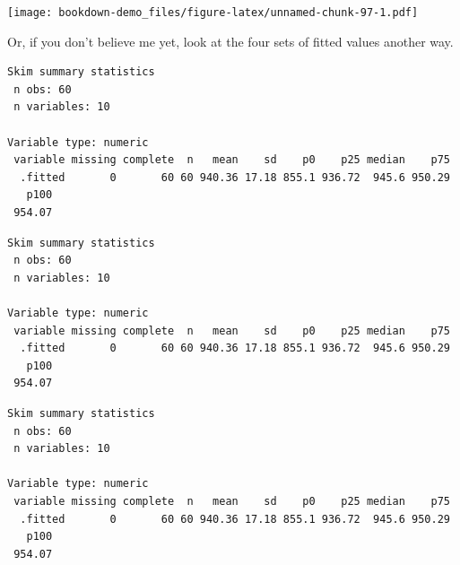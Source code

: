 \documentclass[]{book}
\newenvironment{Shaded}{\begin{snugshade}}{\end{snugshade}}
\newcommand{\KeywordTok}[1]{\textcolor[rgb]{0.13,0.29,0.53}{\textbf{#1}}}
\newcommand{\StringTok}[1]{\textcolor[rgb]{0.31,0.60,0.02}{#1}}
\newcommand{\OperatorTok}[1]{\textcolor[rgb]{0.81,0.36,0.00}{\textbf{#1}}}
\newcommand{\NormalTok}[1]{#1}
\theoremstyle{definition}
\theoremstyle{definition}
\theoremstyle{definition}
\theoremstyle{remark}
\begin{document}
\texttt{[image: bookdown-demo\_files/figure-latex/unnamed-chunk-97-1.pdf]}

Or, if you don't believe me yet, look at the four sets of fitted values
another way.

\begin{Shaded}
\end{Shaded}

\begin{verbatim}
Skim summary statistics
 n obs: 60 
 n variables: 10 

Variable type: numeric 
 variable missing complete  n   mean    sd    p0    p25 median    p75
  .fitted       0       60 60 940.36 17.18 855.1 936.72  945.6 950.29
   p100
 954.07
\end{verbatim}

\begin{Shaded}
\end{Shaded}

\begin{verbatim}
Skim summary statistics
 n obs: 60 
 n variables: 10 

Variable type: numeric 
 variable missing complete  n   mean    sd    p0    p25 median    p75
  .fitted       0       60 60 940.36 17.18 855.1 936.72  945.6 950.29
   p100
 954.07
\end{verbatim}

\begin{Shaded}
\end{Shaded}

\begin{verbatim}
Skim summary statistics
 n obs: 60 
 n variables: 10 

Variable type: numeric 
 variable missing complete  n   mean    sd    p0    p25 median    p75
  .fitted       0       60 60 940.36 17.18 855.1 936.72  945.6 950.29
   p100
 954.07
\end{verbatim}
\end{document}
